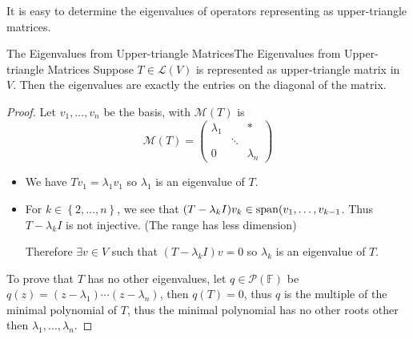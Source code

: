 \documentclass[../main.tex]{subfiles}
\begin{document}
It is easy to determine the eigenvalues of operators representing as upper-triangle matrices.
\begin{theorem}{The Eigenvalues from Upper-triangle Matrices}{The Eigenvalues from Upper-triangle Matrices}
Suppose $T\in \mathscr{L}(V)$ is represented as upper-triangle matrix in $V$. Then the eigenvalues are exactly the entries on the diagonal of the matrix.
\end{theorem}
\begin{proof}
Let $v_1, \ldots ,v_n$ be the basis, with $\mathscr{M}(T)$ is
\begin{equation*}
\mathscr{M}(T) = 
\begin{pmatrix}
	\lambda_1& &*\\
	 &\ddots & \\
	0& &\lambda_n
\end{pmatrix}
\end{equation*}
\begin{itemize}
\item We have $Tv_1=\lambda_1v_1$ so $\lambda_1$ is an eigenvalue of $T$.
\item For $k\in \left\{ 2, \ldots ,n \right\}$, we see that $(T-\lambda_kI)v_k\in \operatorname{span} (v_1, \ldots ,v_{k-1}$. Thus $T-\lambda_kI$ is not injective. (The range has less dimension)

Therefore $\exists v\in V$ such that $(T-\lambda_kI)v=0$ so $\lambda_k$ is an eigenvalue of $T$.
\end{itemize}

To prove that $T$ has no other eigenvalues, let $q\in \mathscr{P}(\mathbb{F})$ be $q(z) = (z-\lambda_1)\cdots (z-\lambda_n)$, then $q(T)=0$, thus $q$ is the multiple of the minimal polynomial of $T$, thus the minimal polynomial has no other roots other then $\lambda_1, \ldots ,\lambda_n$.
\end{proof}
\end{document}

